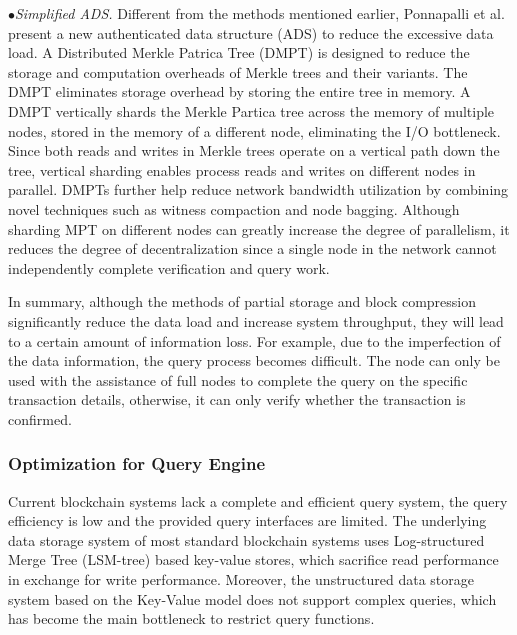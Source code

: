 \documentclass[acmsmall]{acmart}
\begin{document}
$\bullet${\it Simplified ADS.}
Different from the methods mentioned earlier, Ponnapalli et al.~\cite{ponnapalli2019scalable} present a new authenticated data structure (ADS) to reduce the excessive data load. A Distributed Merkle Patrica Tree (DMPT) is designed to reduce the storage and computation overheads of Merkle trees and their variants. The DMPT eliminates storage overhead by storing the entire tree in memory. A DMPT vertically shards the Merkle Partica tree across the memory of multiple nodes, stored in the memory of a different node, eliminating the I/O bottleneck. Since both reads and writes in Merkle trees operate on a vertical path down the tree, vertical sharding enables process reads and writes on different nodes in parallel. DMPTs further help reduce network bandwidth utilization by combining novel techniques such as witness compaction and node bagging. 
Although sharding MPT on different nodes can greatly increase the degree of parallelism, it reduces the degree of decentralization since a single node in the network cannot independently complete verification and query work.





In summary, although the methods of partial storage and block compression significantly reduce the data load and increase system throughput, they will lead to a certain amount of information loss. For example, due to the imperfection of the data information, the query process becomes difficult. The node can only be used with the assistance of full nodes to complete the query on the specific transaction details, otherwise, it can only verify whether the transaction is confirmed.


\subsubsection{Optimization for Query Engine} 


Current blockchain systems lack a complete and efficient query system, the query efficiency is low and the provided query interfaces are limited. The underlying data storage system of most standard blockchain systems uses Log-structured Merge Tree (LSM-tree) based key-value stores, which sacrifice read performance in exchange for write performance. Moreover, the unstructured data storage system based on the Key-Value model does not support complex queries, which has become the main bottleneck to restrict query functions.
\end{document}

